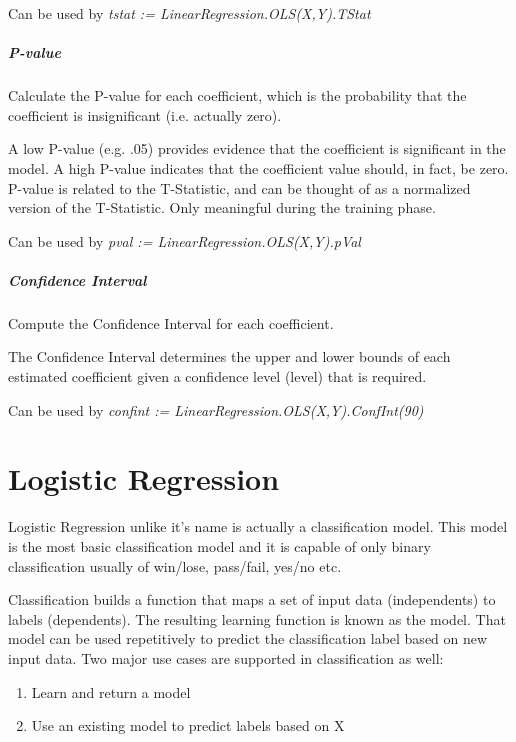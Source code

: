 \documentclass[a4paper,oneside,12pt]{book}
\begin{document}
Can be used by \textit{tstat := LinearRegression.OLS(X,Y).TStat}

\paragraph{P-value}

Calculate the P-value for each coefficient, which is the probability that the coefficient is insignificant (i.e. actually zero).

A low P-value (e.g. .05) provides evidence that the coefficient is significant in the model. A high P-value indicates that the coefficient value should, in fact, be zero. P-value is related to the T-Statistic, and can be thought of as a normalized version of the T-Statistic. Only meaningful during the training phase.

Can be used by \textit{pval := LinearRegression.OLS(X,Y).pVal}

\paragraph{Confidence Interval}

Compute the Confidence Interval for each coefficient.

The Confidence Interval determines the upper and lower bounds of each estimated coefficient given a confidence level (level) that is required.

Can be used by \textit{confint := LinearRegression.OLS(X,Y).ConfInt(90)}

\chapter{Logistic Regression}\label{supe:logreg}

Logistic Regression unlike it's name is actually a classification model. This model is the most basic classification model and it is capable of only binary classification usually of win/lose, pass/fail, yes/no etc.

Classification builds a function that maps a set of input data (independents) to labels (dependents). The resulting learning function is known as the model. That model can be used repetitively to predict the classification label based on new input data. Two major use cases are supported in classification as well:

\begin{enumerate}
    \item Learn and return a model
    \item Use an existing model to predict labels based on X
\end{enumerate}
\end{document}
